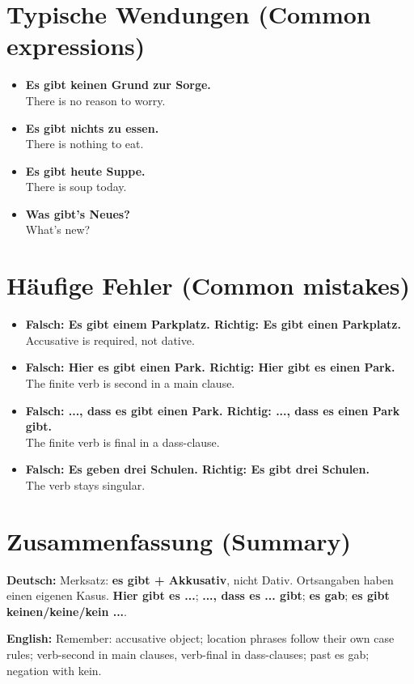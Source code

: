 \documentclass[a4paper,11pt]{article}
\newcommand{\GermanText}[1]{\textbf{Deutsch: }#1\par}
\newcommand{\EnglishText}[1]{{\small\color{SoftGray}\textbf{English: }#1\par}}
\newcommand{\ExampleItem}[2]{\item \textbf{#1}\\{\small\color{SoftGray}#2}}
\begin{document}
   \section{Typische Wendungen (Common expressions)}
                        \begin{exbox}\begin{itemize}
                           \ExampleItem{Es gibt keinen Grund zur Sorge.}{There is no reason to worry.}
                           \ExampleItem{Es gibt nichts zu essen.}{There is nothing to eat.}
                           \ExampleItem{Es gibt heute Suppe.}{There is soup today.}
                           \ExampleItem{Was gibt's Neues?}{What's new?}
                           \end{itemize}\end{exbox}
   \section{Häufige Fehler (Common mistakes)}
                           \begin{exbox}\begin{itemize}
                              \ExampleItem{Falsch: Es gibt einem Parkplatz. Richtig: Es gibt einen Parkplatz.}{Accusative is required, not dative.}
                              \ExampleItem{Falsch: Hier es gibt einen Park. Richtig: Hier gibt es einen Park.}{The finite verb is second in a main clause.}
                              \ExampleItem{Falsch: ..., dass es gibt einen Park. Richtig: ..., dass es einen Park gibt.}{The finite verb is final in a dass-clause.}
                              \ExampleItem{Falsch: Es geben drei Schulen. Richtig: Es gibt drei Schulen.}{The verb stays singular.}
                              \end{itemize}\end{exbox}
   \section{Zusammenfassung (Summary)}
                              \GermanText{Merksatz: \textbf{es gibt + Akkusativ}, nicht Dativ. Ortsangaben haben einen eigenen Kasus. \textbf{Hier gibt es ...}; \textbf{..., dass es ... gibt}; \textbf{es gab}; \textbf{es gibt keinen/keine/kein ...}.}
                              \EnglishText{Remember: accusative object; location phrases follow their own case rules; verb-second in main clauses, verb-final in dass-clauses; past es gab; negation with kein.}
\end{document}
